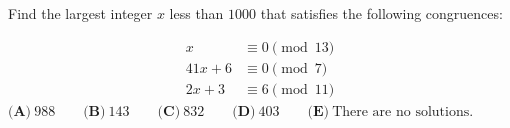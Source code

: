 Find the largest integer $x$ less than $1000$ that satisfies the following congruences:

\begin{align*}
x&\equiv 0\pmod{13}\\
41x+6&\equiv 0\pmod{7}\\
2x+3&\equiv 6\pmod {11}
\end{align*}$\textbf{(A)}~988\qquad\textbf{(B)}~143\qquad\textbf{(C)}~832\qquad\textbf{(D)}~403\qquad\textbf{(E)}~\text{There are no solutions.}\qquad$

